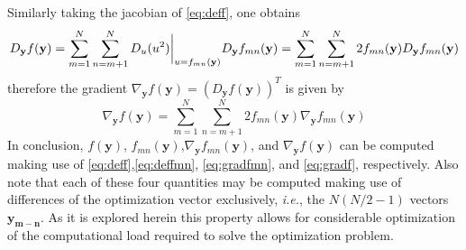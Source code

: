 \documentclass[12pt]{article}
\begin{document}
Similarly taking the jacobian of \eqref{eq:deff}, one obtains
\begin{equation*}\label{key}
D_{\mathbf{y}}f(\mathbf{y}) = \sum_{m=1}^{N}\sum_{n=m+1}^{N} D_u(u^2)\biggr\rvert_{u=f_{mn}(\mathbf{y})}D_{\mathbf{y}}f_{mn}(\mathbf{y})\\= \sum_{m=1}^{N}\sum_{n=m+1}^{N} 2f_{mn}(\mathbf{y})D_{\mathbf{y}}f_{mn}(\mathbf{y})
\end{equation*}
therefore the gradient $\nabla_{\mathbf{y}} f(\mathbf{y}) = \left(D_{\mathbf{y}}f(\mathbf{y})\right)^T$ is given by
\begin{equation}\label{eq:gradf}
\nabla_{\mathbf{y}} f(\mathbf{y}) = \sum_{m=1}^{N}\sum_{n=m+1}^{N} 2f_{mn}(\mathbf{y})\nabla_{\mathbf{y}}f_{mn}(\mathbf{y})
\end{equation}
In conclusion, $f(\mathbf{y})$, $f_{mn}(\mathbf{y})$,$\nabla_{\mathbf{y}} f_{mn}(\mathbf{y})$, and $\nabla_{\mathbf{y}} f(\mathbf{y})$ can be computed making use of \eqref{eq:deff},\eqref{eq:deffmn}, \eqref{eq:gradfmn}, and \eqref{eq:gradf}, respectively. Also note that each of these four quantities may be computed making use of differences of the optimization vector exclusively, \textit{i.e.}, the $N(N/2-1)$ vectors $\mathbf{y_{m-n}}$. As it is explored herein this property allows for considerable optimization of the computational load required to solve the optimization problem.
\end{document}
